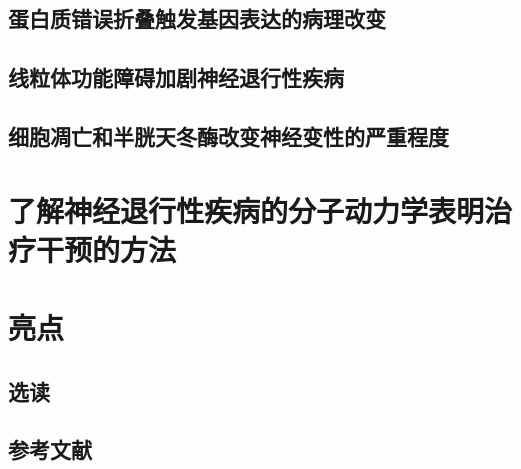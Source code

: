 \subsection{蛋白质错误折叠触发基因表达的病理改变}
\subsection{线粒体功能障碍加剧神经退行性疾病}
\subsection{细胞凋亡和半胱天冬酶改变神经变性的严重程度}

\section{了解神经退行性疾病的分子动力学表明治疗干预的方法}

\section{亮点}
\subsection{选读}
\subsection{参考文献}